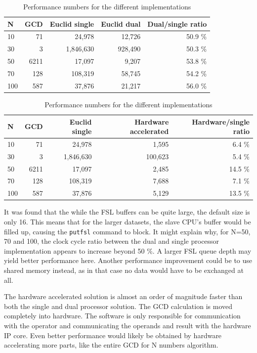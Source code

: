 \documentclass[11pt]{article}
\begin{document}
\begin{table}
  \centering
   \begin{tabular}{l|rrrr}
     \toprule
     N & GCD & Euclid single & Euclid dual & Dual/single ratio \\
     \midrule
     10 & 71 & 24,978 & 12,726 & 50.9 \% \\
     30 & 3 & 1,846,630 & 928,490 & 50.3 \% \\
     50 & 6211 & 17,097 & 9,207 & 53.8 \% \\
     70 & 128 & 108,319 & 58,745 & 54.2 \% \\
     100 & 587 & 37,876 & 21,217 & 56.0 \% \\
     \bottomrule
   \end{tabular}
   \caption{Performance numbers for the different implementations}
   \label{tab:uni-dual}
\end{table}

\begin{table}
  \centering
   \begin{tabular}{l|rrrr}
     \toprule
     N & GCD & Euclid single & Hardware accelerated & Hardware/single ratio \\
     \midrule
     10 & 71 & 24,978 & 1,595 & 6.4 \% \\
     30 & 3 & 1,846,630 & 100,623 & 5.4 \% \\
     50 & 6211 & 17,097 & 2,485 & 14.5 \% \\
     70 & 128 & 108,319 & 7,688 & 7.1 \% \\
     100 & 587 & 37,876 & 5,129 & 13.5 \% \\
     \bottomrule
   \end{tabular}
   \caption{Performance numbers for the different implementations}
   \label{tab:uni-hw}
\end{table}

It was found that the while the FSL buffers can be quite large, the default size is only 16\cite{fsl}. This means that for the larger datasets, the slave CPU's buffer would be filled up, causing the \texttt{putfsl} command to block. It might explain why, for N=50, 70 and 100, the clock cycle ratio between the dual and single processor implementation appears to increase beyond 50 \%. A larger FSL queue depth may yield better performance here. Another performance improvement could be to use shared memory instead, as in that case no data would have to be exchanged at all.

The hardware accelerated solution is almost an order of magnitude faster than both the single and dual processor solution. The GCD calculation is moved completely into hardware. The software is only responsible for communication with the operator and communicating the operands and result with the hardware IP core. Even better performance would likely be obtained by hardware accelerating more parts, like the entire GCD for N numbers algorithm.
\end{document}
